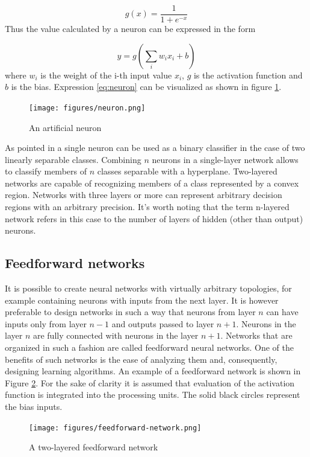 \documentclass[11pt,oneside, a4paper]{report}
\begin{document}
\begin{equation} \label{eq:sigmoid}
g(x) = \frac{1}{1 + e^{-x}}
\end{equation}
Thus the value calculated by a neuron can be expressed in the form

\begin{equation} \label{eq:neuron}
y = g(\sum_{i} w_i x_i + b)
\end{equation}
where $w_i$ is the weight of the i-th input value $x_i$, $g$ is the activation function and $b$ is the bias. Expression \ref{eq:neuron} can be visualized as shown in figure \ref{fig:neuron}.

\begin{figure}[htp]
\centering
\texttt{[image: figures/neuron.png]}
\caption{An artificial neuron}
\label{fig:neuron}
\end{figure}

As pointed in \cite{BISHOP1995} a single neuron can be used as a binary classifier in the case of two linearly separable classes. Combining $n$ neurons in a single-layer network allows to classify members of $n$ classes separable with a hyperplane. Two-layered networks are capable of recognizing members of a class represented by a convex region. Networks with three layers or more can represent arbitrary decision regions with an arbitrary precision.
It's worth noting that the term n-layered network refers in this case to the number of layers of hidden (other than output) neurons.

\subsection{Feedforward networks}
It is possible to create neural networks with virtually arbitrary topologies, for example containing neurons with inputs from the next layer. It is however preferable to design networks in such a way that neurons from layer $n$ can have inputs only from layer $n-1$ and outputs passed to layer $n+1$. Neurons in the layer $n$ are fully connected with neurons in the layer $n+1$. Networks that are organized in such a fashion are called feedforward neural networks. One of the benefits of such networks is the ease of analyzing them and, consequently, designing learning algorithms. 
An example of a feedforward network is shown in Figure \ref{fig:feedforward-network}. For the sake of clarity it is assumed that evaluation of the activation function is integrated into the processing units. The solid black circles represent the bias inputs.
\begin{figure}[htp]
\centering
\texttt{[image: figures/feedforward-network.png]}
\caption{A two-layered feedforward network}
\label{fig:feedforward-network}
\end{figure}
\end{document}
